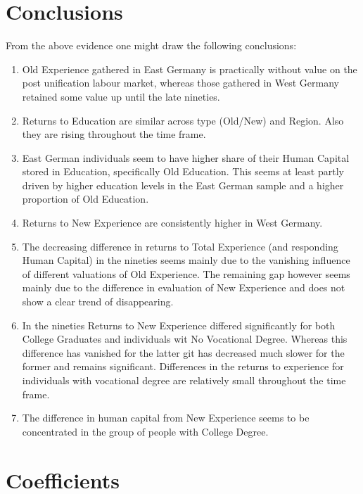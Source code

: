 \documentclass{article}
\begin{document}
\section{Conclusions}
From the above evidence one might draw the following conclusions:
\begin{enumerate}
	\item Old Experience gathered in East Germany is practically without value on the post unification labour market, whereas those gathered in West Germany retained some value up until the late nineties.
	\item Returns to Education are similar across type (Old/New) and Region. Also they are rising throughout the time frame.
	\item East German individuals seem to have higher share of their Human Capital stored in Education, specifically Old Education. This seems at least partly driven by higher education levels in the East German sample and a higher proportion of Old Education.
	\item Returns to New Experience are consistently higher in West Germany. 
	\item The decreasing difference in returns to Total Experience (and responding Human Capital) in the nineties seems mainly due to the vanishing influence of different valuations of Old Experience. The remaining gap however seems mainly due to the difference in evaluation of New Experience and does not show a clear trend of disappearing.
	\item In the nineties Returns to New Experience differed significantly for both College Graduates and individuals wit No Vocational Degree. Whereas this difference has vanished for the latter git has decreased much slower for the former and remains significant. Differences in the returns to experience for individuals with vocational degree are relatively small throughout the time frame.
	\item The difference in human capital from New Experience seems to be concentrated in the group of people with College Degree.
\end{enumerate}

\section{Coefficients}





\end{document}
